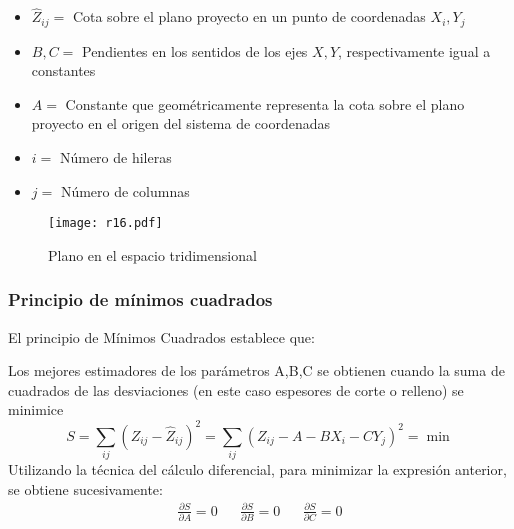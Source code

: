 \begin{notation}
  \begin{itemize}
    \item $\hat{Z}_{ij}=$ Cota sobre el plano proyecto en un punto de coordenadas $X_i,Y_j$
    \item $B,C=$ Pendientes en los sentidos de los ejes $X,Y$, respectivamente igual a constantes
    \item $A=$ Constante que geométricamente representa la cota sobre el plano proyecto en el origen del sistema de coordenadas
    \item $i=$ Número de hileras
    \item $j=$ Número de columnas
  \end{itemize}
\end{notation}
\begin{figure}[h!]
\centering
  \texttt{[image: r16.pdf]}
  \caption{Plano en el espacio tridimensional}
  \label{r16}
\end{figure}
\subsubsection{Principio de mínimos cuadrados}
El principio de Mínimos Cuadrados establece que:
\begin{theorem}
  Los mejores estimadores de los parámetros A,B,C se obtienen cuando la suma de cuadrados de las desviaciones (en este caso espesores de corte o relleno) se minimice
  \begin{equation}
    S = \sum_{ij} \left(Z_{ij} - \hat{Z}_{ij}\right)^2 = \sum_{ij} \left(Z_{ij} - A - BX_i - CY_j\right)^2 = \min 
  \end{equation}
  Utilizando la técnica del cálculo diferencial, para minimizar la expresión anterior, se obtiene sucesivamente:
  \begin{align}
    \frac{\partial S}{\partial A} = 0&& \frac{\partial S}{\partial B} = 0&& \frac{\partial S}{\partial C} = 0
  \end{align}
\end{theorem}
